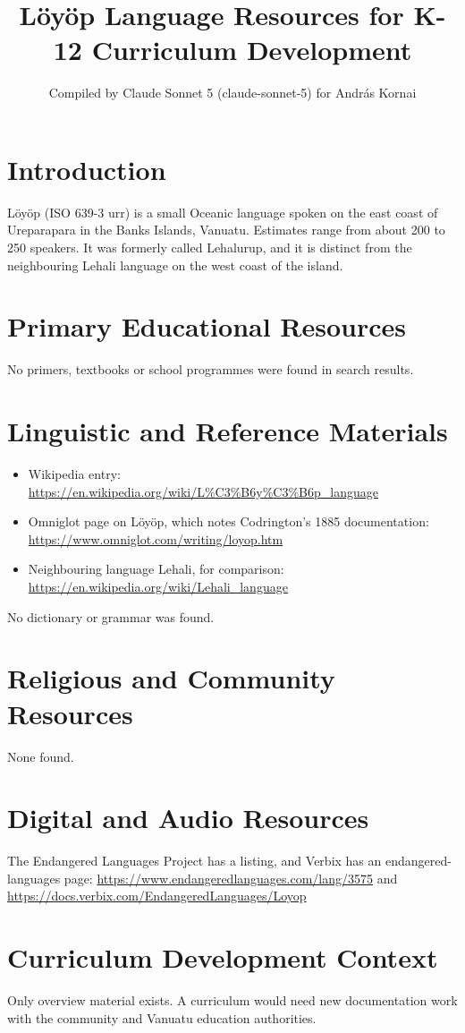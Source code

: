 \documentclass[12pt]{article}
\title{L\"oy\"op Language Resources for K-12 Curriculum Development}
\author{Compiled by Claude Sonnet 5 (claude-sonnet-5) for Andr\'as Kornai}
\date{}
\begin{document}
\maketitle

\section{Introduction}
L\"oy\"op (ISO 639-3 urr) is a small Oceanic language spoken on the east coast of Ureparapara in the Banks Islands, Vanuatu. Estimates range from about 200 to 250 speakers. It was formerly called Lehalurup, and it is distinct from the neighbouring Lehali language on the west coast of the island.

\section{Primary Educational Resources}
No primers, textbooks or school programmes were found in search results.

\section{Linguistic and Reference Materials}
\begin{itemize}
\item Wikipedia entry: \url{https://en.wikipedia.org/wiki/L%C3%B6y%C3%B6p_language}
\item Omniglot page on L\"oy\"op, which notes Codrington's 1885 documentation: \url{https://www.omniglot.com/writing/loyop.htm}
\item Neighbouring language Lehali, for comparison: \url{https://en.wikipedia.org/wiki/Lehali_language}
\end{itemize}
No dictionary or grammar was found.

\section{Religious and Community Resources}
None found.

\section{Digital and Audio Resources}
The Endangered Languages Project has a listing, and Verbix has an endangered-languages page: \url{https://www.endangeredlanguages.com/lang/3575} and \url{https://docs.verbix.com/EndangeredLanguages/Loyop}

\section{Curriculum Development Context}
Only overview material exists. A curriculum would need new documentation work with the community and Vanuatu education authorities.
\end{document}
